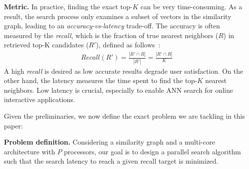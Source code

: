 

\noindent
\textbf{Metric.} In practice, finding the exact top-$K$ can be very time-consuming. As a result, the search process only examines a subset of vectors in the similarity graph, leading to an \emph{accuracy-vs-latency} trade-off. The accuracy is often measured by the \emph{recall}, which is the fraction of true nearest neighbors ($R$) in retrieved top-K candidates ($R'$), defined as follows~\cite{fu2016efanna}:
\begin{align} \label{minjia_formula:recall}
    Recall(R') = \frac{\left | R' \cap R \right |}{\left | R' \right |} = \frac{\left | R' \cap R \right |}{K}
\end{align}
A high \emph{recall} is desired as low accurate results degrade user satisfaction.
On the other hand, the latency measures the time spent to find the top-$K$ nearest neighbors. Low latency is crucial, especially to enable ANN search for online interactive applications. 

Given the preliminaries, we now define the exact problem we are tackling in this paper:

\noindent
\textbf{Problem definition.} Considering a similarity graph and a multi-core architecture with $P$ processors, our goal is to design a parallel search algorithm such that the search latency to reach a given recall target is minimized. 






